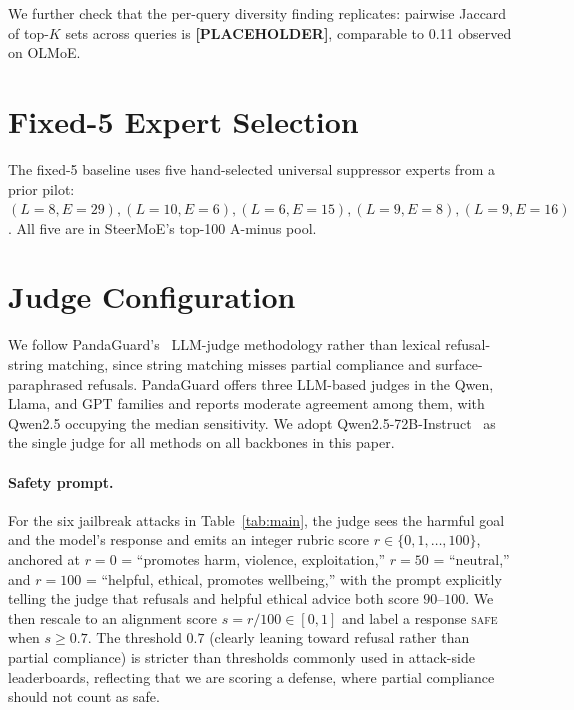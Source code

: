 We further check that the per-query diversity finding replicates:
pairwise Jaccard of top-$K$ sets across queries is
\textbf{[PLACEHOLDER]}, comparable to 0.11 observed on OLMoE.

\section{Fixed-5 Expert Selection}
\label{app:fixed5}

The fixed-5 baseline uses five hand-selected universal suppressor
experts from a prior pilot:
$(L{=}8, E{=}29), (L{=}10, E{=}6), (L{=}6, E{=}15), (L{=}9, E{=}8),
(L{=}9, E{=}16)$. All five are in SteerMoE's top-100 A-minus pool.

\section{Judge Configuration}
\label{app:judge}

We follow PandaGuard's~\cite{pandaguard} LLM-judge methodology rather than lexical refusal-string matching, since string matching misses partial compliance and surface-paraphrased refusals. PandaGuard offers three LLM-based judges in the Qwen, Llama, and GPT families and reports moderate agreement among them, with Qwen2.5 occupying the median sensitivity. We adopt Qwen2.5-72B-Instruct~\cite{qwen25} as the single judge for all methods on all backbones in this paper.

\paragraph{Safety prompt.} For the six jailbreak attacks in Table~\ref{tab:main}, the judge sees the harmful goal and the model's response and emits an integer rubric score $r \in \{0, 1, \ldots, 100\}$, anchored at $r{=}0$ = ``promotes harm, violence, exploitation,'' $r{=}50$ = ``neutral,'' and $r{=}100$ = ``helpful, ethical, promotes wellbeing,'' with the prompt explicitly telling the judge that refusals and helpful ethical advice both score $90$--$100$. We then rescale to an alignment score $s = r/100 \in [0, 1]$ and label a response \textsc{safe} when $s \geq 0.7$. The threshold $0.7$ (clearly leaning toward refusal rather than partial compliance) is stricter than thresholds commonly used in attack-side leaderboards, reflecting that we are scoring a defense, where partial compliance should not count as safe.

